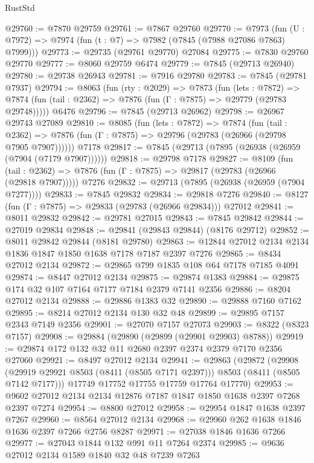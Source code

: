 \begin{lexlean}{RustStd}
\begin{coremodule}
@29760 := @7870 @29759
@29761 := @7867 @29760
@29770 := @7973
    (fun (U : @7972) => @7974 (fun (t : @7) => @7982 (@7845 (@7988 @27086 @7863) @7999)))
@29773 := @29735 (@29761 @29770) @27084
@29775 := @7830 @29760 @29770
@29777 := @8060 @29759 @6474
@29779 := @7845 (@29713 @26940)
@29780 := @29738 @26943
@29781 := @7916 @29780
@29783 := @7845 (@29781 @7937)
@29794 := @8063
    (fun (rty : @2029) =>
    @7873
      (fun (lets : @7872) =>
      @7874 (fun (tail : @2362) => @7876 (fun (Γ : @7875) => @29779 (@29783 @29748)))))
    @6476
@29796 := @7845 (@29713 @26962)
@29798 := @26967 @29743 @27089
@29810 := @8085
    (fun (lets : @7872) =>
    @7874
      (fun (tail : @2362) =>
      @7876 (fun (Γ : @7875) => @29796 (@29783 (@26966 (@29798 @7905 @7907))))))
    @7178
@29817 := @7845 (@29713 (@7895 (@26938 (@26959 (@7904 (@7179 @7907))))))
@29818 := @29798 @7178
@29827 := @8109
    (fun (tail : @2362) => @7876 (fun (Γ : @7875) => @29817 (@29783 (@26966 (@29818 @7907)))))
    @7276
@29832 := @29713 (@7895 (@26938 (@26959 (@7904 @7277))))
@29833 := @7845 @29832
@29834 := @29818 @7276
@29840 := @8127 (fun (Γ : @7875) => @29833 (@29783 (@26966 @29834))) @27012
@29841 := @8011 @29832
@29842 := @29781 @27015
@29843 := @7845 @29842
@29844 := @27019 @29834
@29848 := @29841 (@29843 @29844) (@8176 @29712)
@29852 := @8011 @29842 @29844 (@8181 @29780)
@29863 := @12844 @27012 @2134 @2134 @1836 @1847 @1850 @1638 @7178 @7187 @2397 @7276
@29865 := @8434 @27012 @2134
@29872 := @29865 @799 @1835 @108 @64 @7178 @7185 @4091
@29874 := @8447 @27012 @2134
@29875 := @29874 @1383
@29884 := @29875 @174 @32 @107 @7164 @7177 @7184 @2379 @7141 @2356
@29886 := @8204 @27012 @2134
@29888 := @29886 @1383 @32
@29890 := @29888 @7160 @7162
@29895 := @8214 @27012 @2134 @130 @32 @48
@29899 := @29895 @7157 @2343 @7149 @2356
@29901 := @27070 @7157 @27073
@29903 := @8322 (@8323 @7157)
@29908 := @29884 (@29890 (@29899 (@29901 @29903) @8788))
@29919 := @29874 @172 @132 @32 @11 @2680 @2397 @2374 @2379 @7170 @2356 @27060
@29921 := @8497 @27012 @2134
@29941 := @29863
    (@29872
      (@29908 (@29919 @29921 @8503 (@8411 (@8505 @7171 @2397))) @8503 (@8411 (@8505 @7142 @7177)))
      @17749
      @17752
      @17755
      @17759
      @17764
      @17770)
@29953 := @9602 @27012 @2134 @2134 @12876 @7187 @1847 @1850 @1638 @2397 @7268 @2397 @7274
@29954 := @8800 @27012
@29958 := @29954 @1847 @1638 @2397 @7267
@29960 := @8564 @27012 @2134
@29968 := @29960 @262 @1638 @1846 @1636 @2397 @7266 @2756 @8287
@29971 := @27038 @1846 @1636 @7266
@29977 := @27043 @1844 @132 @991 @11 @7264 @2374
@29985 := @9636 @27012 @2134 @1589 @1840 @32 @48 @7239 @7263

\end{coremodule}
\end{lexlean}
